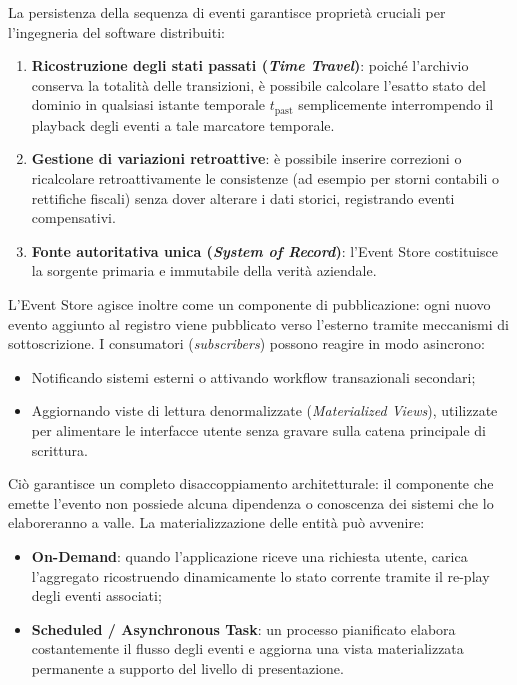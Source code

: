 \documentclass[11pt, a4paper]{article}
\begin{document}
La persistenza della sequenza di eventi garantisce proprietà cruciali per l'ingegneria del software distribuiti:
\begin{enumerate}[noitemsep]
    \item \textbf{Ricostruzione degli stati passati (\emph{Time Travel})}: poiché l'archivio conserva la totalità delle transizioni, è possibile calcolare l'esatto stato del dominio in qualsiasi istante temporale $t_{\text{past}}$ semplicemente interrompendo il playback degli eventi a tale marcatore temporale.
    \item \textbf{Gestione di variazioni retroattive}: è possibile inserire correzioni o ricalcolare retroattivamente le consistenze (ad esempio per storni contabili o rettifiche fiscali) senza dover alterare i dati storici, registrando eventi compensativi.
    \item \textbf{Fonte autoritativa unica (\emph{System of Record})}: l'Event Store costituisce la sorgente primaria e immutabile della verità aziendale.
\end{enumerate}

L'Event Store agisce inoltre come un componente di pubblicazione: ogni nuovo evento aggiunto al registro viene pubblicato verso l'esterno tramite meccanismi di sottoscrizione. I consumatori (\emph{subscribers}) possono reagire in modo asincrono:
\begin{itemize}
    \item Notificando sistemi esterni o attivando workflow transazionali secondari;
    \item Aggiornando viste di lettura denormalizzate (\emph{Materialized Views}), utilizzate per alimentare le interfacce utente senza gravare sulla catena principale di scrittura.
\end{itemize}
Ciò garantisce un completo disaccoppiamento architetturale: il componente che emette l'evento non possiede alcuna dipendenza o conoscenza dei sistemi che lo elaboreranno a valle. La materializzazione delle entità può avvenire:
\begin{itemize}
    \item \textbf{On-Demand}: quando l'applicazione riceve una richiesta utente, carica l'aggregato ricostruendo dinamicamente lo stato corrente tramite il re-play degli eventi associati;
    \item \textbf{Scheduled / Asynchronous Task}: un processo pianificato elabora costantemente il flusso degli eventi e aggiorna una vista materializzata permanente a supporto del livello di presentazione.
\end{itemize}
\end{document}
